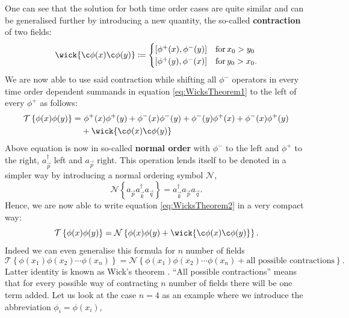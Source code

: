 One can see that the solution for both time order cases are quite similar and can be generalised further by introducing a new quantity, the so-called \textbf{contraction} of two fields:
\begin{equation}\label{eq:Contraction}
    \wick{ \c\phi(x)\c\phi(y) }\coloneqq
    \begin{cases}
        \left[ \phi^+(x),\phi^-(y) \right] & \text{for}\, x_0 > y_0 \\
        \left[ \phi^+(y),\phi^-(x) \right] & \text{for}\, y_0 > x_0.
    \end{cases}
\end{equation}
We are now able to use said contraction while shifting all $\phi^-$ operators in every time order dependent summands in equation \ref{eq:WicksTheorem1} to the left of every $\phi^+$ as follows:
\begin{align}
    \mathcal{T}\left\{ \phi(x)\phi(y) \right\} =&\ \phi^+(x)\phi^+(y) + \phi^-(x)\phi^-(y) + \phi^-(y)\phi^+(x) + \phi^-(x)\phi^+(y)\nonumber \\
    &+ \wick{ \c\phi(x)\c\phi(y) } \label{eq:WicksTheorem2}
\end{align}
Above equation is now in so-called \textbf{normal order} with $\phi^-$ to the left and $\phi^+$ to the right, \ie $a_{\vec{p}}^{\dagger}$ left and $a_{\vec{p}}$ right. This operation lends itself to be denoted in a simpler way by introducing a normal ordering symbol $\mathcal{N}$, \eg
\begin{equation}\label{eq:NormalOrderingSymbol}
    \mathcal{N}\left\{a_{\vec{p}} a_{\vec{k}}^{\dagger} a_{\vec{q}}\right\} = a_{\vec{k}}^{\dagger} a_{\vec{p}} a_{\vec{q}}.
\end{equation}
Hence, we are now able to write equation \ref{eq:WicksTheorem2} in a very compact way:
\begin{equation}
    \mathcal{T}\left\{ \phi(x)\phi(y) \right\} = \mathcal{N}\left\{ \phi(x)\phi(y) + \wick{ \c\phi(x)\c\phi(y) } \right\}.
\end{equation}
Indeed we can even generalise this formula for $n$ number of fields
\begin{equation}\label{eq:WicksTheorem}
    \mathcal{T}\left\{ \phi(x_1)\phi(x_2) \cdots \phi(x_n) \right\} = \mathcal{N}\left\{ \phi(x_1)\phi(x_2)\cdots \phi(x_n) + \text{all possible contractions} \right\}.
\end{equation}
Latter identity is known as Wick's theorem \cite{WicksTheorem}. ``All possible contractions'' means that for every possible way of contracting $n$ number of fields there will be one term added. Let us look at the case $n=4$ as an example where we introduce the abbreviation $\phi_i = \phi(x_i)$,
